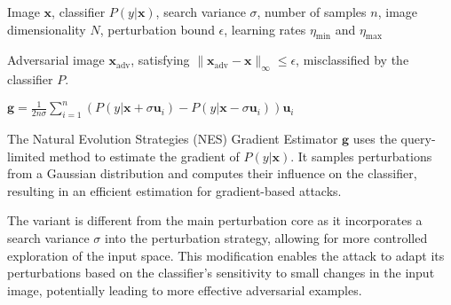 Image $\mathbf{x}$, classifier $P(y|\mathbf{x})$, search variance $\sigma$, number of samples $n$, image dimensionality $N$, perturbation bound $\epsilon$, learning rates $\eta_{\text{min}}$ and $\eta_{\text{max}}$

Adversarial image $\mathbf{x}_{\text{adv}}$, satisfying $\|\mathbf{x}_{\text{adv}} - \mathbf{x}\|_\infty \leq \epsilon$, misclassified by the classifier $P$. 

$\mathbf{g} = \frac{1}{2n\sigma} \sum_{i=1}^{n} \left( P(y|\mathbf{x} + \sigma \mathbf{u}_i) - P(y|\mathbf{x} - \sigma \mathbf{u}_i) \right) \mathbf{u}_i$

The Natural Evolution Strategies (NES) Gradient Estimator $\mathbf{g}$ uses the query-limited method to estimate the gradient of $P(y|\mathbf{x})$. It samples perturbations from a Gaussian distribution and computes their influence on the classifier, resulting in an efficient estimation for gradient-based attacks.

The variant is different from the main perturbation core as it incorporates a search variance $\sigma$ into the perturbation strategy, allowing for more controlled exploration of the input space. This modification enables the attack to adapt its perturbations based on the classifier's sensitivity to small changes in the input image, potentially leading to more effective adversarial examples.